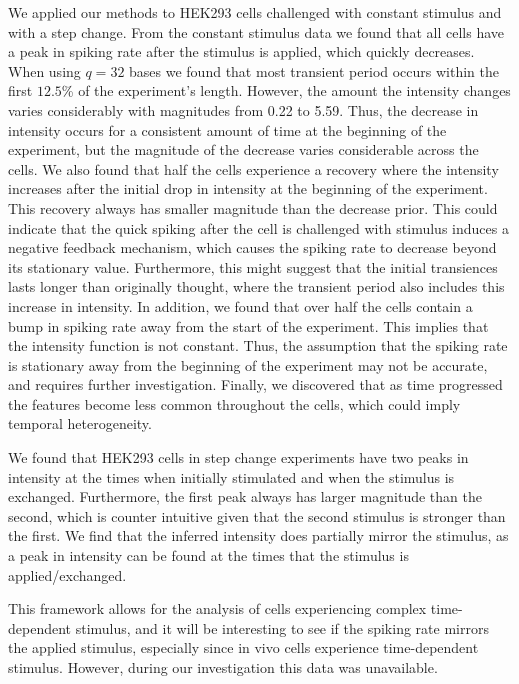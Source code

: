 \documentclass[../main.tex]{subfiles}
\begin{document}
We applied our methods to HEK293 cells challenged with constant stimulus and with a step change. From the constant stimulus data we found that all cells have a peak in spiking rate after the stimulus is applied, which quickly decreases. When using $q=32$ bases we found that most transient period occurs within the first $12.5$\% of the experiment's length. However, the amount the intensity changes varies considerably with magnitudes from 0.22 to 5.59. Thus, the decrease in intensity occurs for a consistent amount of time at the beginning of the experiment, but the magnitude of the decrease varies considerable across the cells. We also found that half the cells experience a recovery where the intensity increases after the initial drop in intensity at the beginning of the experiment. This recovery always has smaller magnitude than the decrease prior. This could indicate that the quick  spiking after the cell is challenged with stimulus induces a negative feedback mechanism, which causes the spiking rate to decrease beyond its stationary value. Furthermore, this might suggest that the initial transiences lasts longer than originally thought, where the transient period also includes this increase in intensity. In addition,  we found that over half the cells contain a bump in spiking rate away from the start of the experiment. This implies that the intensity function is not constant. Thus, the assumption that the spiking rate is stationary away from the beginning of the experiment may not be accurate, and requires further investigation. Finally, we discovered that as time progressed the features become less common throughout the cells, which could imply temporal heterogeneity.
 
 
 We found that HEK293 cells in step change experiments have two peaks in intensity at the times when initially stimulated and when the stimulus is exchanged. Furthermore, the first peak always has larger magnitude than the second, which is counter intuitive given that the second stimulus is stronger than the first. We find that the inferred intensity does partially mirror the stimulus, as a peak in intensity can be found at the times that the stimulus is applied/exchanged.    

This framework allows for the analysis of cells experiencing complex time-dependent stimulus, and it will be interesting to see if the spiking rate mirrors the applied stimulus, especially since in vivo cells experience time-dependent stimulus. However, during our investigation this data was unavailable. 
 

% 
%
%
\end{document}
